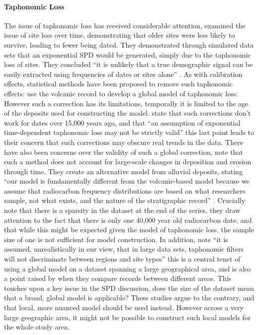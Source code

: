 \paragraph{Taphonomic Loss}
The issue of taphonomic loss has received considerable attention, \citet{SUROVELL20071868} examined the issue of site loss over time, demonstrating that older sites were less likely to survive, leading to fewer being dated. They demonstrated through simulated data sets that an exponential SPD would be generated, simply due to the taphonomic loss of sites. They concluded ``it is unlikely that a true demographic signal can be easily extracted using frequencies of dates or sites alone''  \citep[1874]{SUROVELL20071868}. As with calibration effects, statistical methods have been proposed to remove such taphonomic effects: \citet{SUROVELL20091715} use the volcanic record to develop a global model of taphonomic loss. However such a correction has its limitations, temporally it is limited to the age of the deposits used for constructing the model. \citet[584]{Williams2012578} state that such corrections don't work for dates over 15,000 years ago, and that ``an assumption of exponential time-dependent taphonomic loss may not be strictly valid'' \citep[586]{Williams2012578} this last point leads to their concern that such corrections may obscure real trends in the data. There have also been concerns over the validity of such a global correction, \citet[1321]{BALLENGER20111314} note that such a method does not account for large-scale changes in deposition and erosion through time. They create an alternative model from alluvial deposits, stating  ``our model is fundamentally different from the volcanic-based model because we assume that radiocarbon frequency distributions are based on what researchers sample, not what exists, and the nature of the stratigraphic record'' \citep[1322]{BALLENGER20111314}. Crucially \citet[1322]{BALLENGER20111314} note that there is a sparsity in the dataset at the end of the series, they draw attention to the fact that there is only one 40,000 year old radiocarbon date, and that while this might be expected given the model of taphonomic loss, the sample size of one is not  sufficient for model construction. In addition, \citet[593]{CONTRERAS2014591} note ``it is assumed, unrealistically in our view, that in large data sets, taphonomic filters will not discriminate between regions and site types'' this is a central tenet of using a global model on a dataset spanning a large geographical area, and is also a point raised by \citet{BALLENGER20111314} when they compare records between different areas. This touches upon a key issue in the SPD discussion, does the size of the dataset mean that a broad, global model is applicable? These studies argue to the contrary, and that local, more nuanced model should be used instead. However across a very large geographic area, it might not be possible to construct such local models for the whole study area.

